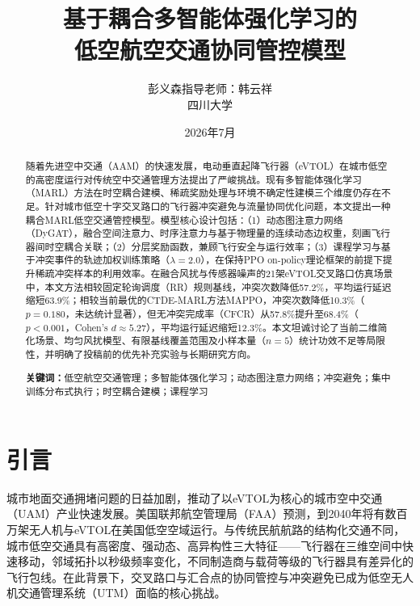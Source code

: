 \documentclass[12pt,a4paper,UTF8]{ctexart}
\title{\textbf{基于耦合多智能体强化学习的\\低空航空交通协同管控模型}}
\author{彭义森\quad 指导老师：韩云祥\\[4pt]
\small 四川大学}
\date{2026年7月}
\begin{document}
\maketitle

\begin{abstract}
随着先进空中交通（AAM）的快速发展，电动垂直起降飞行器（eVTOL）在城市低空的高密度运行对传统空中交通管理方法提出了严峻挑战。现有多智能体强化学习（MARL）方法在时空耦合建模、稀疏奖励处理与环境不确定性建模三个维度仍存在不足。针对城市低空十字交叉路口的飞行器冲突避免与流量协同优化问题，本文提出一种耦合MARL低空交通管控模型。模型核心设计包括：（1）动态图注意力网络（DyGAT），融合空间注意力、时序注意力与基于物理量的连续动态边权重，刻画飞行器间时空耦合关联；（2）分层奖励函数，兼顾飞行安全与运行效率；（3）课程学习与基于冲突事件的轨迹加权训练策略（$\lambda=2.0$），在保持PPO on-policy理论框架的前提下提升稀疏冲突样本的利用效率。在融合风扰与传感器噪声的21架eVTOL交叉路口仿真场景中，本文方法相较固定轮询调度（RR）规则基线，冲突次数降低57.2\%，平均运行延迟缩短63.9\%；相较当前最优的CTDE-MARL方法MAPPO，冲突次数降低10.3\%（$p=0.180$，未达统计显著），但无冲突完成率（CFCR）从57.8\%提升至68.4\%（$p<0.001$，Cohen's $d \approx 5.27$），平均运行延迟缩短12.3\%。本文坦诚讨论了当前二维简化场景、均匀风扰模型、有限基线覆盖范围及小样本量（$n=5$）统计功效不足等局限性，并明确了投稿前的优先补充实验与长期研究方向。

\noindent\textbf{关键词：}低空航空交通管理；多智能体强化学习；动态图注意力网络；冲突避免；集中训练分布式执行；时空耦合建模；课程学习
\end{abstract}

\section{引言}

城市地面交通拥堵问题的日益加剧，推动了以eVTOL为核心的城市空中交通（UAM）产业快速发展。美国联邦航空管理局（FAA）预测，到2040年将有数百万架无人机与eVTOL在美国低空空域运行\cite{ref26}。与传统民航航路的结构化交通不同，城市低空交通具有高密度、强动态、高异构性三大特征——飞行器在三维空间中快速移动，邻域拓扑以秒级频率变化，不同制造商与载荷等级的飞行器具有差异化的飞行包线。在此背景下，交叉路口与汇合点的协同管控与冲突避免已成为低空无人机交通管理系统（UTM）面临的核心挑战。
\end{document}
